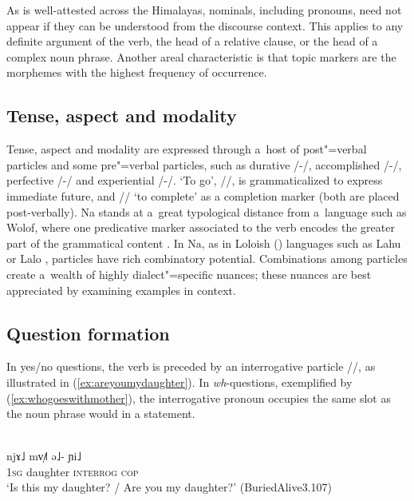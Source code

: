 As is well-attested across the Himalayas, nominals, including pronouns, need not appear if they can be understood from the discourse context. This applies to any definite argument of the verb, the head of a relative clause, or the head of a complex noun phrase. Another areal characteristic is that topic markers are the morphemes with the highest frequency of occurrence.

\subsection{Tense, aspect and modality}
\label{sec:tenseaspectmodality}
Tense, aspect and modality are expressed through a~host of post"=verbal particles and some pre"=verbal particles, such as {durative} /-/, {accomplished} /-/, {perfective} /-/ and {experiential} /-/. ‘To go’, //, is grammaticalized to express immediate future, and // ‘to complete’ as a completion marker (both are placed post-verbally). Na stands at a~great typological distance from a~language such as Wolof, where one predicative marker associated to the verb encodes the greater part of the grammatical content \citep{creisselsetal1998, guerin2015}. In Na, as in Loloish () languages such as Lahu \citep{matisoff1973a} or Lalo \citep{bjorverud1998}, particles have rich combinatory potential. Combinations among particles create a~wealth of highly dialect"=specific nuances; these nuances are best appreciated by examining examples in context. 


\subsection{Question formation}
\label{sec:qformation}
In yes/no questions, the verb is preceded by an interrogative particle //, as illustrated in (\ref{ex:areyoumydaughter}). In \textit{wh}-questions, exemplified by (\ref{ex:whogoeswithmother}), the interrogative pronoun occupies the same slot as the noun phrase would in a statement. 

\begin{exe}
	\ex
	\label{ex:areyoumydaughter}
	\\
	\gll njɤ˩				mv̩˩˥		ə˩-						ɲi˩\\
	\textsc{1sg}		daughter		\textsc{interrog}		\textsc{cop}\\
	\glt ‘Is this my daughter? / Are you my daughter?’ (BuriedAlive3.107)
\end{exe}

